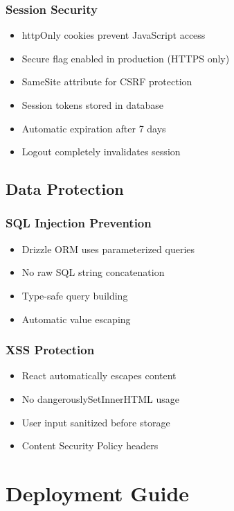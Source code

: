 \documentclass[12pt,a4paper]{report}
\begin{document}
\subsection{Session Security}

\begin{itemize}
    \item httpOnly cookies prevent JavaScript access
    \item Secure flag enabled in production (HTTPS only)
    \item SameSite attribute for CSRF protection
    \item Session tokens stored in database
    \item Automatic expiration after 7 days
    \item Logout completely invalidates session
\end{itemize}

\section{Data Protection}

\subsection{SQL Injection Prevention}

\begin{itemize}
    \item Drizzle ORM uses parameterized queries
    \item No raw SQL string concatenation
    \item Type-safe query building
    \item Automatic value escaping
\end{itemize}

\subsection{XSS Protection}

\begin{itemize}
    \item React automatically escapes content
    \item No dangerouslySetInnerHTML usage
    \item User input sanitized before storage
    \item Content Security Policy headers
\end{itemize}

\chapter{Deployment Guide}
\end{document}
